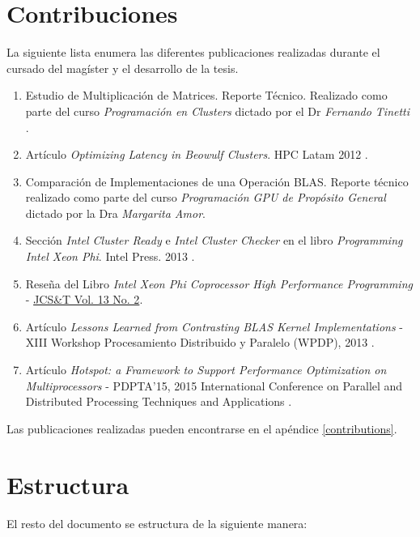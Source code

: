 \documentclass[a4paper]{report}
\begin{document}
\section{Contribuciones}

La siguiente lista enumera las diferentes publicaciones realizadas durante el cursado del magíster y el desarrollo de la tesis.

\begin{enumerate}
\item Estudio de Multiplicación de Matrices. Reporte Técnico. Realizado como parte del curso {\it Programación en Clusters} dictado por el Dr {\it Fernando Tinetti} \cite{mm-tool}.
\item Artículo {\it Optimizing Latency in Beowulf Clusters}. HPC Latam 2012 \cite{latency}.
\item Comparación de Implementaciones de una Operación BLAS. Reporte técnico realizado como parte del curso {\it Programación GPU de Propósito General} dictado por la Dra {\it Margarita Amor}.
\item Sección {\it Intel Cluster Ready} e {\it Intel Cluster Checker} en el libro {\it Programming Intel Xeon Phi}. Intel Press. 2013 \cite{xeonphi}.
\item Reseña del Libro {\it Intel Xeon Phi Coprocessor High Performance Programming} - \href{http://journal.info.unlp.edu.ar/journal/journal36/papers/JCST-Oct13-BR1.pdf}{JCS\&T Vol. 13 No. 2}.
\item Artículo {\it Lessons Learned from Contrasting BLAS Kernel Implementations} - XIII Workshop Procesamiento Distribuido y Paralelo (WPDP), 2013 \cite{lessons}.
\item Artículo {\it Hotspot: a Framework to Support Performance Optimization on Multiprocessors} - PDPTA'15, 2015 International Conference on Parallel and Distributed Processing Techniques and Applications \cite{hotspot-paper}.
\end{enumerate}

Las publicaciones realizadas pueden encontrarse en el apéndice \ref{contributions}.

\section{Estructura}

El resto del documento se estructura de la siguiente manera:
\end{document}
